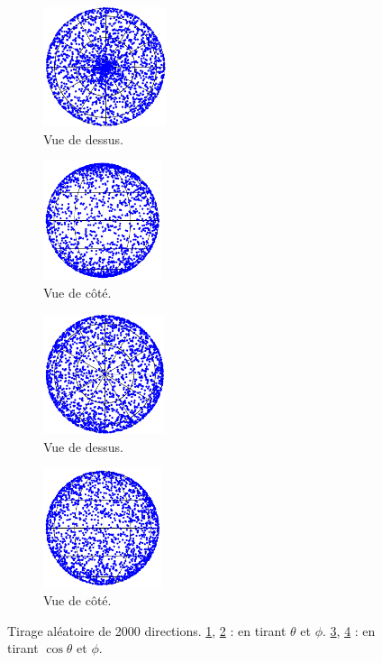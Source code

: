 \documentclass[11pt,a4paper]{article}
\numberwithin{equation}{section}
\begin{document}
\begin{figure}[h!]
\center
    \begin{subfigure}[b]{0.22\textwidth}
    	\center
    	\includegraphics[height=3.5cm]{figures/dessus1.pdf}
    	\caption{Vue de dessus.}
    	\label{a}
    \end{subfigure}	
	\begin{subfigure}[b]{0.22\textwidth}
    	\center
    	\includegraphics[height=3.5cm]{figures/side1.pdf}
    	\caption{Vue de côté.}
    	\label{b}
    \end{subfigure}
		\begin{subfigure}[b]{0.05\textwidth}
		\hspace{0.1cm}
    	\center
    \end{subfigure}
    \begin{subfigure}[b]{0.22\textwidth}
    	\center
    	\includegraphics[height=3.5cm]{figures/dessus2.pdf}
    	\caption{Vue de dessus.}
    	\label{c}
    \end{subfigure}	
    \begin{subfigure}[b]{0.22\textwidth}
    	\center
    	\includegraphics[height=3.5cm]{figures/side2.pdf}
    	\caption{Vue de côté.}
    	\label{d}
    \end{subfigure}	
    \caption{Tirage aléatoire de 2000 directions. \ref{a}, \ref{b} : en tirant  $\theta$ et $\phi$. \ref{c}, \ref{d} : en tirant  $\cos \theta$ et $\phi$.}
    \label{equipartition}
\end{figure}
\vspace{-0.6cm}
\end{document}
